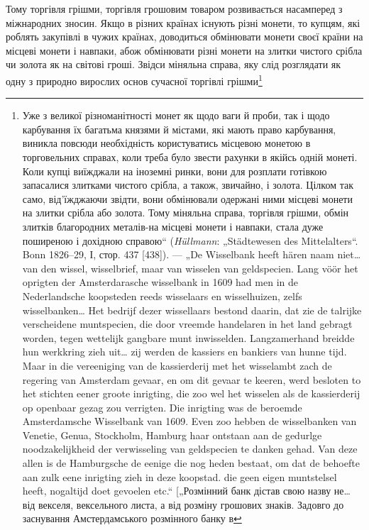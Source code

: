 Тому торгівля грішми, торгівля грошовим товаром розвивається
насамперед з міжнародних зносин. Якщо в різних країнах
існують різні монети, то купцям, які роблять закупівлі в чужих
країнах, доводиться обмінювати монети своєї країни на місцеві
монети і навпаки, абож обмінювати різні монети на злитки чистого
срібла чи золота як на світові гроші. Звідси міняльна справа, яку
слід розглядати як одну з природно вирослих основ сучасної торгівлі
грішми\footnote{
Уже з великої різноманітності монет як щодо ваги й проби, так і щодо
карбування їх багатьма князями й містами, які мають право карбування, виникла
повсюди необхідність користуватись місцевою монетою в торговельних справах,
коли треба було звести рахунки в якійсь одній монеті. Коли купці
виїжджали на іноземні ринки, вони для розплати готівкою запасалися злитками
чистого срібла, а також, звичайно, і золота. Цілком так само, від’їжджаючи
звідти, вони обмінювали одержані ними місцеві монети на злитки
срібла або золота. Тому міняльна справа, торгівля грішми, обмін злитків благородних
металів-на місцеві монети і навпаки, стала дуже поширеною і дохідною
справою“ (\emph{Hüllmann}: „Städtewesen des Mittelalters“. Bonn 1826--29,
І, стор. 437 [438]). — „De Wisselbank heeft hären naam niet\dots{} van den wissel, wisselbrief,
maar van wisselen van geldspecien. Lang vöör het oprigten der Amsterdarasche
wisselbank in 1609 had men in de Nederlandsche koopsteden reeds wisselaars
en wisselhuizen, zelfs wisselbanken\dots{} Het bedrijf dezer wissellaars bestond
daarin, dat zie de talrijke verscheidene muntspecien, die door vreemde handelaren
in het land gebragt worden, tegen wettelijk gangbare munt inwisselden. Langzamerhand
breidde hun werkkring zieh uit\dots{} zij werden de kassiers en bankiers van
hunne tijd. Maar in die vereeniging van de kassierderij met het wisselambt zach
de regering van Amsterdam gevaar, en om dit gevaar te keeren, werd besloten to
het stichten eener groote inrigting, die zoo wel het wisselen als de kassierderij op
openbaar gezag zou verrigten. Die inrigting was de beroemde Amsterdamsche Wisselbank
van 1609. Even zoo hebben de wisselbanken van Venetie, Genua, Stockholm,
Hamburg haar ontstaan aan de gedurlge noodzakelijkheid der verwisseling van
geldspecien te danken gehad. Van deze allen is de Hamburgsche de eenige die
nog heden bestaat, om dat de behoefte aan zulk eene inrigting zieh in deze
koopstad. die geen eigen muntstelsel heeft, nogaltijd doet gevoelen etc.“ [„Розмінний
банк дістав свою назву не\dots{} від векселя, вексельного листа, а від розміну
грошових знаків. Задовго до заснування Амстердамського розмінного банку в
}
